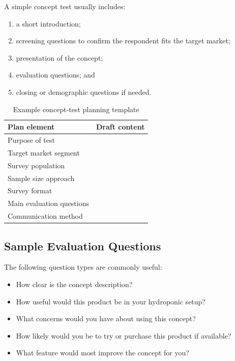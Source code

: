 A simple concept test usually includes:
\begin{enumerate}
    \item a short introduction;
    \item screening questions to confirm the respondent fits the target market;
    \item presentation of the concept;
    \item evaluation questions; and
    \item closing or demographic questions if needed.
\end{enumerate}

\begin{table}[htbp]
\centering
\caption{Example concept-test planning template}
\label{tab:session12-test-plan}
\renewcommand{\arraystretch}{1.2}
\begin{tabularx}{\textwidth}{|>{\raggedright\arraybackslash}p{}|X|}
\hline
\textbf{Plan element} & \textbf{Draft content} \\
\hline
Purpose of test &  \\
\hline
Target market segment &  \\
\hline
Survey population &  \\
\hline
Sample size approach &  \\
\hline
Survey format &  \\
\hline
Main evaluation questions &  \\
\hline
Communication method &  \\
\hline
\end{tabularx}
\end{table}

\subsection{Sample Evaluation Questions}

The following question types are commonly useful:
\begin{itemize}
    \item How clear is the concept description?
    \item How useful would this product be in your hydroponic setup?
    \item What concerns would you have about using this concept?
    \item How likely would you be to try or purchase this product if available?
    \item What feature would most improve the concept for you?
\end{itemize}

